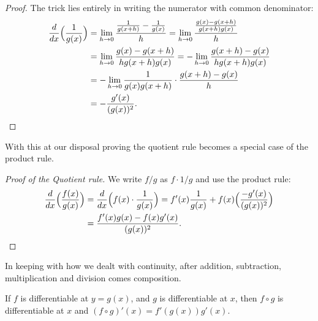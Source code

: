 \begin{proof}
	The trick lies entirely in writing the numerator with common denominator:
	\begin{align*}
		\frac{d}{d x} \Big ( \frac{1}{g(x)} \Big ) & = \lim_{h \to 0} \frac{\frac{1}{g(x + h)} - \frac{1}{g(x)}}{h} = \lim_{h \to 0} \frac{\frac{g(x) - g(x + h)}{g(x + h) g(x)}}{h} \\
		                                           & = \lim_{h \to 0} \frac{g(x) - g(x + h)}{h g(x + h) g(x)} = - \lim_{h \to 0} \frac{g(x + h) - g(x)}{h g(x + h) g(x)}             \\
		                                           & = - \lim_{h \to 0} \frac{1}{g(x) g(x + h)} \cdot \frac{g(x + h) - g(x)}{h}                                                      \\
		                                           & = - \frac{g'(x)}{(g(x))^2}. \qedhere
	\end{align*}
\end{proof}

\noindent
With this at our disposal proving the quotient rule becomes a special case of the product rule.

\begin{proof}[Proof of the Quotient rule]
	We write $f / g$ as $f \cdot 1 / g$ and use the product rule:
	\begin{align*}
		\frac{d}{d x} \Big ( \frac{f(x)}{g(x)} \Big ) & = \frac{d}{d x} \Big ( f(x) \cdot \frac{1}{g(x)} \Big ) = f'(x) \frac{1}{g(x)} + f(x) \Big ( \frac{- g'(x)}{(g(x))^2} \Big ) \\
		                                              & = \frac{f'(x) g(x) - f(x) g'(x)}{(g(x))^2}. \qedhere
	\end{align*}
\end{proof}

\noindent
In keeping with how we dealt with continuity, after addition, subtraction, multiplication and division comes composition.

\begin{theorem}
	If $f$ is differentiable at $y = g(x)$, and $g$ is differentiable at $x$, then $f \circ g$ is differentiable at $x$ and $(f \circ g)'(x) = f'(g(x)) g'(x)$.
\end{theorem}

